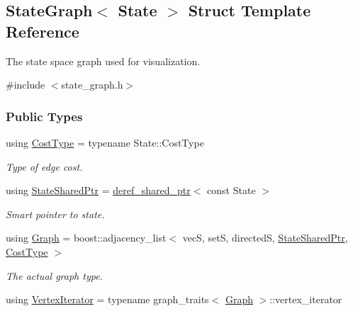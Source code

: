\hypertarget{structStateGraph}{}\subsection{State\+Graph$<$ State $>$ Struct Template Reference}
\label{structStateGraph}


The state space graph used for visualization.  




{\ttfamily \#include $<$state\+\_\+graph.\+h$>$}

\subsubsection*{Public Types}
\begin{DoxyCompactItemize}
\item 
using \hyperlink{structStateGraph_a4426dc0a4427fa1856af4d98bfe93aba}{Cost\+Type} = typename State\+::\+Cost\+Type\hypertarget{structStateGraph_a4426dc0a4427fa1856af4d98bfe93aba}{}\label{structStateGraph_a4426dc0a4427fa1856af4d98bfe93aba}

\begin{DoxyCompactList}\small\item\em Type of edge cost. \end{DoxyCompactList}\item 
using \hyperlink{structStateGraph_a891fe4273003d7714f397f0d5dbae964}{State\+Shared\+Ptr} = \hyperlink{classderef__shared__ptr}{deref\+\_\+shared\+\_\+ptr}$<$ const State $>$\hypertarget{structStateGraph_a891fe4273003d7714f397f0d5dbae964}{}\label{structStateGraph_a891fe4273003d7714f397f0d5dbae964}

\begin{DoxyCompactList}\small\item\em Smart pointer to state. \end{DoxyCompactList}\item 
using \hyperlink{structStateGraph_a150e6f41e378ed1d2d78967244a23a68}{Graph} = boost\+::adjacency\+\_\+list$<$ vecS, setS, directedS, \hyperlink{structStateGraph_a891fe4273003d7714f397f0d5dbae964}{State\+Shared\+Ptr}, \hyperlink{structStateGraph_a4426dc0a4427fa1856af4d98bfe93aba}{Cost\+Type} $>$\hypertarget{structStateGraph_a150e6f41e378ed1d2d78967244a23a68}{}\label{structStateGraph_a150e6f41e378ed1d2d78967244a23a68}

\begin{DoxyCompactList}\small\item\em The actual graph type. \end{DoxyCompactList}\item 
using \hyperlink{structStateGraph_a67d1f184fe2f10714c92241132221ab5}{Vertex\+Iterator} = typename graph\+\_\+traits$<$ \hyperlink{structStateGraph_a150e6f41e378ed1d2d78967244a23a68}{Graph} $>$\+::vertex\+\_\+iterator\hypertarget{structStateGraph_a67d1f184fe2f10714c92241132221ab5}{}\label{structStateGraph_a67d1f184fe2f10714c92241132221ab5}


\end{DoxyCompactItemize}
